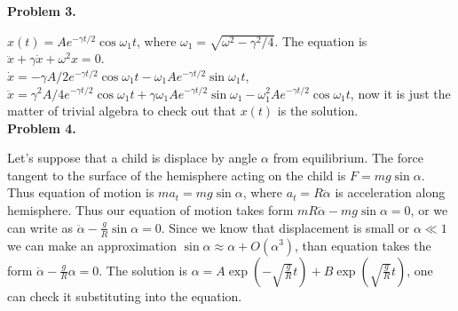 \documentclass[12pt]{article}
\begin{document}
{\bf Problem 3.}

$x(t)=A e^{-\gamma t/2}\cos\omega_1 t$, where $\omega_1=\sqrt{\omega^2-\gamma^2/4}$. The equation is 
$\ddot{x}+\gamma\dot{x}+\omega^2 x=0$.\\
$\dot{x}=-\gamma A/2 e^{-\gamma t/2}\cos\omega_1 t -\omega_1 A e^{-\gamma t/2}\sin\omega_1 t$,\\
$\ddot{x}=\gamma^2 A/4 e^{-\gamma t/2}\cos\omega_1 t +\gamma\omega_1 A e^{-\gamma t/2}\sin\omega_1 - \omega_1^2 A e^{-\gamma t/2}\cos\omega_1 t$,
now it is just the matter of trivial algebra to check out that $x(t)$ is the solution.
\\

{\bf Problem 4.}

Let's suppose that a child is displace by angle $\alpha$ from equilibrium. The force tangent to the  surface of the hemisphere  acting on the child is $F=mg\sin\alpha$. Thus equation of motion 
is $ma_t=mg\sin\alpha$, where $a_t=R \ddot{\alpha}$ is acceleration along hemisphere.
Thus our equation of motion takes form
$mR\ddot{\alpha}-mg\sin\alpha=0$, or we can write as $ \ddot{\alpha}-\frac{g}{R}\sin\alpha=0.$
Since we know that displacement is small or $\alpha\ll 1$ we can make an approximation
$\sin\alpha\approx \alpha+O(\alpha^3)$, than equation takes the form
$ \ddot{\alpha}-\frac{g}{R}\alpha=0$. The  solution is $\alpha=A \exp(-\sqrt{\frac{g}{R}}t)+B \exp(\sqrt{\frac{g}{R}}t)$,
one can check it substituting into the equation.
\end{document}

